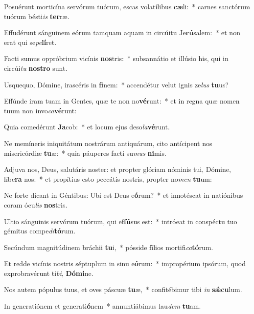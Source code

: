 \item Posuérunt morticína servórum tuórum, escas volatílibus \textbf{cæ}li:~* carnes sanctórum tuórum bésti\textit{is} \textbf{ter}ræ.
\item Effudérunt sánguinem eórum tamquam aquam in circúitu Je\textbf{rú}salem:~* et non erat qui se\textit{pe}\textbf{lí}ret.
\item Facti sumus oppróbrium vicínis \textbf{nos}tris:~* subsannátio et illúsio his, qui in circúi\textit{tu} \textbf{nos}\textbf{tro} sunt.
\item Usquequo, Dómine, irascéris in \textbf{fi}nem:~* accendétur velut ignis ze\textit{lus} \textbf{tu}us?
\item Effúnde iram tuam in Gentes, quæ te non no\textbf{vé}runt:~* et in regna quæ nomen tuum non invo\textit{ca}\textbf{vé}runt:
\item Quia comedérunt \textbf{Ja}cob:~* et locum ejus deso\textit{la}\textbf{vé}runt.
\item Ne memíneris iniquitátum nostrárum antiquárum, cito antícipent nos misericórdiæ \textbf{tu}æ:~* quia páuperes facti su\textit{mus} \textbf{ni}mis.
\item Adjuva nos, Deus, salutáris noster: et propter glóriam nóminis tui, Dómine, líbe\textbf{ra} nos:~* et propítius esto peccátis nostris, propter no\textit{men} \textbf{tu}um:
\item Ne forte dicant in Géntibus: Ubi est Deus e\textbf{ó}rum?~* et innotéscat in natiónibus coram ócu\textit{lis} \textbf{nos}tris.
\item Ultio sánguinis servórum tuórum, qui ef\textbf{fú}sus est:~* intróeat in conspéctu tuo gémitus compe\textit{di}\textbf{tó}rum.
\item Secúndum magnitúdinem bráchii \textbf{tu}i,~* pósside fílios mortifi\textit{ca}\textbf{tó}rum.
\item Et redde vicínis nostris séptuplum in sinu e\textbf{ó}rum:~* impropérium ipsórum, quod exprobravérunt ti\textit{bi}, \textbf{Dó}\textbf{mi}ne.
\item Nos autem pópulus tuus, et oves páscuæ \textbf{tu}æ,~* confitébimur tibi \textit{in} \textbf{sǽ}\textbf{cu}lum.
\item In generatiónem et generati\textbf{ó}nem~* annuntiábimus lau\textit{dem} \textbf{tu}am.
